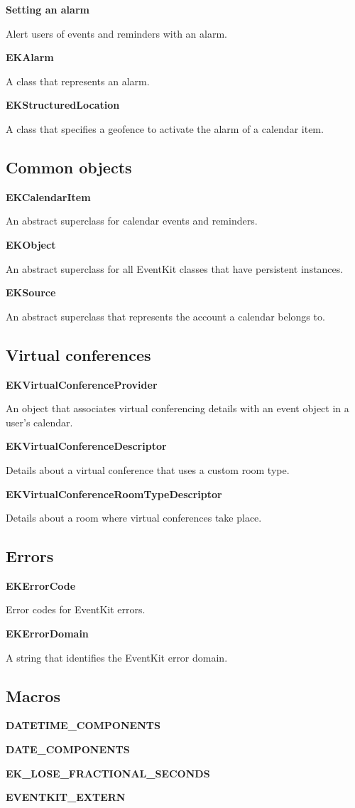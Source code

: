 \documentclass{article}
\begin{document}
\textbf{Setting an alarm}

Alert users of events and reminders with an alarm.

\textbf{EKAlarm}

A class that represents an alarm.

\textbf{EKStructuredLocation}

A class that specifies a geofence to activate the alarm of a calendar item.

\subsection*{Common objects}

\textbf{EKCalendarItem}

An abstract superclass for calendar events and reminders.

\textbf{EKObject}

An abstract superclass for all EventKit classes that have persistent instances.

\textbf{EKSource}

An abstract superclass that represents the account a calendar belongs to.

\subsection*{Virtual conferences}

\textbf{EKVirtualConferenceProvider}

An object that associates virtual conferencing details with an event object in a user's calendar.

\textbf{EKVirtualConferenceDescriptor}

Details about a virtual conference that uses a custom room type.

\textbf{EKVirtualConferenceRoomTypeDescriptor}

Details about a room where virtual conferences take place.

\subsection*{Errors}

\textbf{EKErrorCode}

Error codes for EventKit errors.

\textbf{EKErrorDomain}

A string that identifies the EventKit error domain.

\subsection*{Macros}

\textbf{DATETIME\_COMPONENTS}

\textbf{DATE\_COMPONENTS}

\textbf{EK\_LOSE\_FRACTIONAL\_SECONDS}

\textbf{EVENTKIT\_EXTERN}

\newpage
\end{document}
